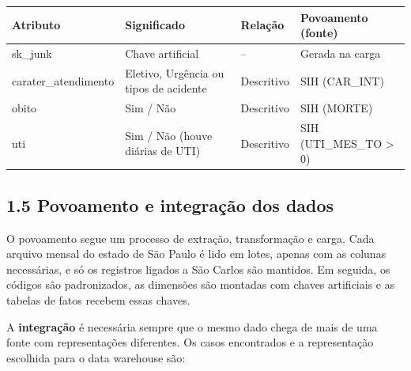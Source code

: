 \documentclass[12pt,a4paper]{article}
\begin{document}
{\small{}\begin{longtable}{|>{\raggedright\arraybackslash}p{}|>{\raggedright\arraybackslash}p{}|>{\raggedright\arraybackslash}p{}|>{\raggedright\arraybackslash}p{}|}\hline\rowcolor{azul}\color{white}\bfseries Atributo & \color{white}\bfseries Significado & \color{white}\bfseries Relação & \color{white}\bfseries Povoamento (fonte) \\ \hline\endhead
sk\_\allowbreak{}junk & Chave artificial & – & Gerada na carga \\ \hline
carater\_\allowbreak{}atendimento & Eletivo, Urgência ou tipos de acidente & Descritivo & SIH (CAR\_\allowbreak{}INT) \\ \hline
obito & Sim / Não & Descritivo & SIH (MORTE) \\ \hline
uti & Sim / Não (houve diárias de UTI) & Descritivo & SIH (UTI\_\allowbreak{}MES\_\allowbreak{}TO > 0) \\ \hline\end{longtable}}

\FloatBarrier\subsection*{1.5 Povoamento e integração dos dados}

O povoamento segue um processo de extração, transformação e carga. Cada arquivo mensal do estado de São Paulo é lido em lotes, apenas com as colunas necessárias, e só os registros ligados a São Carlos são mantidos. Em seguida, os códigos são padronizados, as dimensões são montadas com chaves artificiais e as tabelas de fatos recebem essas chaves.


A \textbf{integração} é necessária sempre que o mesmo dado chega de mais de uma fonte com representações diferentes. Os casos encontrados e a representação escolhida para o data warehouse são:
\end{document}
